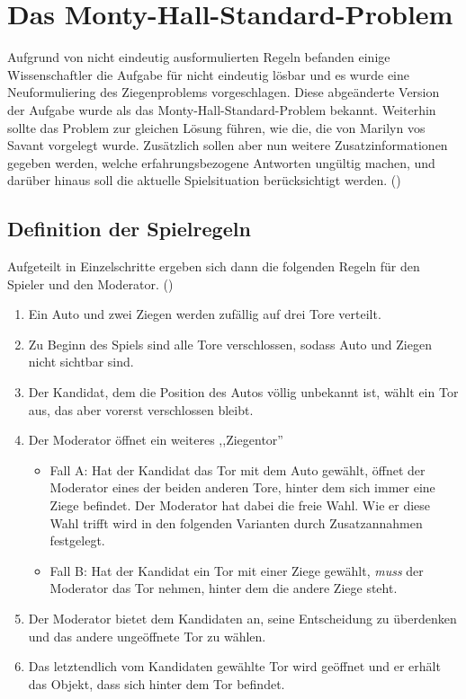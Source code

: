 
\chapter{Das Monty-Hall-Standard-Problem} \label{chap:monty-hall-standard}

Aufgrund von nicht eindeutig ausformulierten Regeln befanden einige Wissenschaftler die Aufgabe für nicht eindeutig lösbar und es wurde eine Neuformuliering des
Ziegenproblems vorgeschlagen. Diese abgeänderte Version der Aufgabe wurde als das Monty-Hall-Standard-Problem bekannt. Weiterhin sollte das Problem zur gleichen
Lösung führen, wie die, die von Marilyn vos Savant vorgelegt wurde. Zusätzlich sollen aber nun weitere Zusatzinformationen gegeben werden, welche erfahrungsbezogene Antworten ungültig
machen, und darüber hinaus soll die aktuelle Spielsituation berücksichtigt werden. (\cite{Mueser:1999})

\section{Definition der Spielregeln}

Aufgeteilt in Einzelschritte ergeben sich dann die folgenden Regeln für den Spieler und den Moderator. (\cite{Savant:2001})
\begin{enumerate}
    \item Ein Auto und zwei Ziegen werden zufällig auf drei Tore verteilt.
    \item Zu Beginn des Spiels sind alle Tore verschlossen, sodass Auto und Ziegen nicht sichtbar sind.
    \item Der Kandidat, dem die Position des Autos völlig unbekannt ist, wählt ein Tor aus, das aber vorerst verschlossen bleibt.
    \item Der Moderator öffnet ein weiteres ,,Ziegentor''\begin{itemize}
              \item Fall A: Hat der Kandidat das Tor mit dem Auto gewählt, öffnet der Moderator eines der beiden anderen Tore, hinter dem sich immer eine Ziege befindet.
                    Der Moderator hat dabei die freie Wahl. Wie er diese Wahl trifft wird in den folgenden Varianten durch Zusatzannahmen festgelegt.
              \item Fall B: Hat der Kandidat ein Tor mit einer Ziege gewählt, \textit{muss} der Moderator das Tor nehmen, hinter dem die andere Ziege steht.
          \end{itemize}
    \item Der Moderator bietet dem Kandidaten an, seine Entscheidung zu überdenken und das andere ungeöffnete Tor zu wählen.
    \item Das letztendlich vom Kandidaten gewählte Tor wird geöffnet und er erhält das Objekt, dass sich hinter dem Tor befindet.
\end{enumerate}

